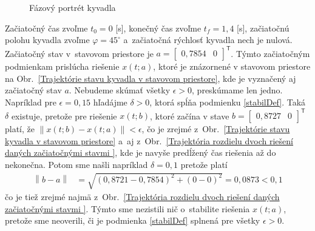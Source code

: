 \documentclass[a4paper, 10pt, ]{article}
\begin{document}
\begin{figure}[!t]
    \centering

    \vspace{-8mm}


    \vspace{-13mm}

    \caption{Fázový portrét kyvadla}
    \label{Fázový portrét kyvadla}



\end{figure}















\bigskip


Začiatočný čas zvoľme $t_0 = 0$ [s], konečný čas zvoľme $t_f = 1,4$ [s], začiatočnú polohu kyvadla zvoľme $\varphi = 45^{\circ}$ a~začiatočná rýchlosť kyvadla nech je nulová. Začiatočný stav v~stavovom priestore je $a = \begin{bmatrix} 0,7854 & 0 \end{bmatrix}^\mathsf{T}$. Týmto začiatočným podmienkam prislúcha riešenie $x(t;a)$, ktoré je znázornené v stavovom priestore na Obr.~\ref{Trajektórie stavu kyvadla v stavovom priestore}, kde je vyznačený aj začiatočný stav $a$. Nebudeme skúmať všetky $\epsilon > 0$, preskúmame len jedno. Napríklad pre $\epsilon = 0,15$ hľadájme $\delta > 0$, ktorá spĺňa podmienku \eqref{stabilDef}. Taká $\delta$ existuje, pretože pre riešenie $x(t;b)$, ktoré začína v stave $b = \begin{bmatrix} 0,8727 & 0 \end{bmatrix}^\mathsf{T}$ platí, že $\left\| x(t;b) - x(t;a) \right\| < \epsilon$, čo je zrejmé z~Obr.~\ref{Trajektórie stavu kyvadla v stavovom priestore} a~aj z~Obr.~\ref{Trajektória rozdielu dvoch riešení daných začiatočnými stavmi }, kde je navyše predĺžený čas riešenia až do nekonečna. Potom sme našli napríklad $\delta = 0,1$ pretože platí
\begin{equation}
	\begin{split}
		\left\| b - a \right\| &= \sqrt{(0,8721 - 0,7854)^2 + (0 - 0)^2} =  0,0873 < 0,1
	\end{split}
\end{equation}
čo je tiež zrejmé najmä z~Obr.~\ref{Trajektória rozdielu dvoch riešení daných začiatočnými stavmi }. Týmto sme nezistili nič o~stabilite riešenia $x(t;a)$, pretože sme neoverili, či je podmienka \eqref{stabilDef} splnená pre všetky $\epsilon > 0$.
\end{document}
